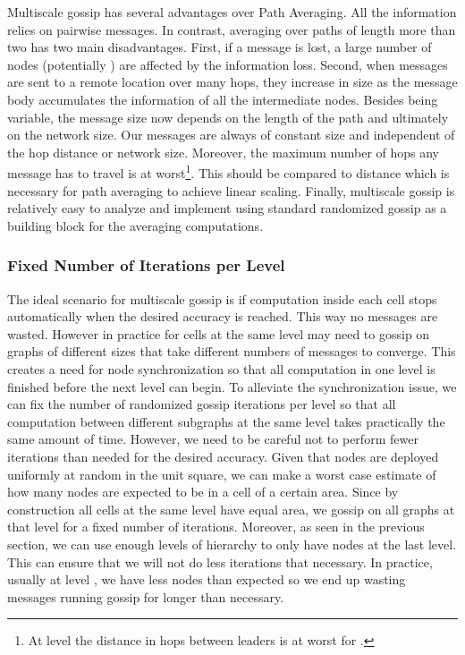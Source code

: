 Multiscale gossip has several advantages over Path Averaging. All the information relies on pairwise messages. In contrast, averaging over paths of length more than two has two main disadvantages. First, if a message is lost, a large number of nodes (potentially ) are affected by the information loss. Second, when messages are sent to a remote location over many hops, they increase in size as the message body accumulates the information of all the intermediate nodes. Besides being variable, the message size now depends on the length of the path and ultimately on the network size. Our messages are always of constant size and independent of the hop distance or network size. Moreover, the maximum number of hops any message has to travel is  at worst\footnote{At level  the distance in hops between leaders is at worst  for .}. This should be compared to distance  which is necessary for path averaging to achieve linear scaling. Finally, multiscale gossip is relatively easy to analyze and implement using standard randomized gossip as a building block for the averaging computations.

\subsubsection*{Fixed Number of Iterations per Level} The ideal scenario for multiscale gossip is if computation inside each cell stops automatically when the desired accuracy is reached. This way no messages are wasted. However in practice for cells at the same level may need to gossip on graphs of different sizes that take different numbers of messages to converge. This creates a need for node synchronization so that all computation in one level is finished before the next level can begin. To alleviate the synchronization issue, we can fix the number of randomized gossip iterations per level so that all computation between different subgraphs at the same level takes practically the same amount of time. However, we need to be careful not to perform fewer iterations than needed for the desired accuracy. Given that nodes are deployed uniformly at random in the unit square, we can make a worst case estimate of how many nodes are expected to be in a cell of a certain area. Since by construction all cells at the same level have equal area, we gossip on all graphs at that level for a fixed number of iterations. Moreover, as seen in the previous section, we can use enough levels of hierarchy to only have  nodes at the last level. This can ensure that we will not do less iterations that necessary. In practice, usually at level , we have less nodes than expected so we end up wasting messages running gossip for longer than necessary. 


